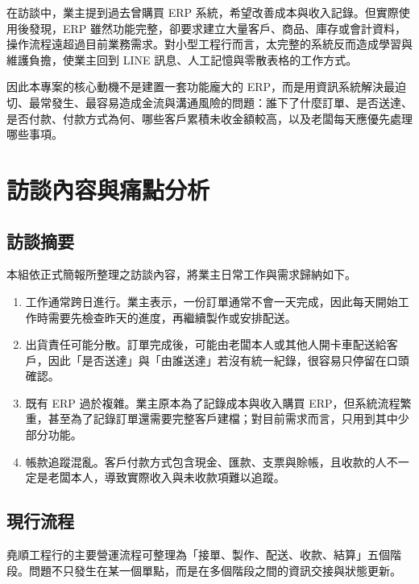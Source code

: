 \documentclass[12pt,a4paper,UTF8,fontset=none]{ctexart}
\begin{document}
在訪談中，業主提到過去曾購買 ERP 系統，希望改善成本與收入記錄。但實際使用後發現，ERP 雖然功能完整，卻要求建立大量客戶、商品、庫存或會計資料，操作流程遠超過目前業務需求。對小型工程行而言，太完整的系統反而造成學習與維護負擔，使業主回到 LINE 訊息、人工記憶與零散表格的工作方式。

因此本專案的核心動機不是建置一套功能龐大的 ERP，而是用資訊系統解決最迫切、最常發生、最容易造成金流與溝通風險的問題：誰下了什麼訂單、是否送達、是否付款、付款方式為何、哪些客戶累積未收金額較高，以及老闆每天應優先處理哪些事項。

\section{訪談內容與痛點分析}

\subsection{訪談摘要}

本組依正式簡報所整理之訪談內容，將業主日常工作與需求歸納如下。

\begin{enumerate}
  \item 工作通常跨日進行。業主表示，一份訂單通常不會一天完成，因此每天開始工作時需要先檢查昨天的進度，再繼續製作或安排配送。
  \item 出貨責任可能分散。訂單完成後，可能由老闆本人或其他人開卡車配送給客戶，因此「是否送達」與「由誰送達」若沒有統一紀錄，很容易只停留在口頭確認。
  \item 既有 ERP 過於複雜。業主原本為了記錄成本與收入購買 ERP，但系統流程繁重，甚至為了記錄訂單還需要完整客戶建檔；對目前需求而言，只用到其中少部分功能。
  \item 帳款追蹤混亂。客戶付款方式包含現金、匯款、支票與賒帳，且收款的人不一定是老闆本人，導致實際收入與未收款項難以追蹤。
\end{enumerate}

\subsection{現行流程}

堯順工程行的主要營運流程可整理為「接單、製作、配送、收款、結算」五個階段。問題不只發生在某一個單點，而是在多個階段之間的資訊交接與狀態更新。
\end{document}
